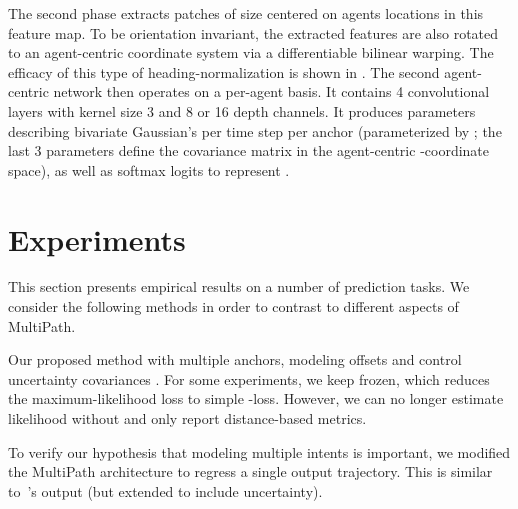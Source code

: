 \documentclass{article}
\newcommand{\out}[1]{}
\newcommand{\multiflow}{MultiPath\xspace}
\newcommand{\supsecref}[1]{\secref{#1}}
\begin{document}
The second phase extracts patches of size  centered on agents locations in this feature map. To be orientation invariant, the extracted features are also rotated to an agent-centric coordinate system via a differentiable bilinear warping. The efficacy of this type of heading-normalization is shown in \supsecref{sec:normalizaton}. The second agent-centric network then operates on a per-agent basis. It contains 4 convolutional layers with kernel size 3 and 8 or 16 depth channels. It produces  parameters describing bivariate Gaussian's per time step per anchor (parameterized by ; the last 3 parameters define the  covariance matrix  in the agent-centric -coordinate space), as well as  softmax logits to represent .
\out{
NOTE(bensapp): these are implementation details specific to a particular dataset and should be in the experimental implementation details section, or supplement:

The first scene-level feature extractor is a thinned-out ResNet50 \cite{He16}, with the number of channels reduced to 12.5\% of the default values (also known as using a depth multiplier of 12.5\%). We then extract agent-specific feature patches of size 11px11px from the scene-level feature map. The patch feature is centered at the agent’s position and rotated according to the agent’s heading. We apply a second CNN on the cropped patch features. This agent-level feature extractor consists of 4 convolutional layers with kernel size 3 each. The depth and stride are, 16/2, 8/2, 16/1, 16/1, respectively.
} \section{Experiments} \label{sec:experiments}

This section presents empirical results on a number of prediction tasks. We consider the following methods in order to contrast to different aspects of \multiflow.

\PAR{\multiflow  [, ].} Our proposed method with multiple anchors, modeling offsets  and control uncertainty covariances . For some experiments, we keep  frozen, which reduces the maximum-likelihood loss to simple -loss. However, we can no longer estimate likelihood  without  and only report distance-based metrics. 

 To verify our hypothesis that modeling multiple intents is important, we modified the \multiflow architecture to regress a single output trajectory. This is similar to~\cite{Luo18}'s output (but extended to include uncertainty).
\end{document}
